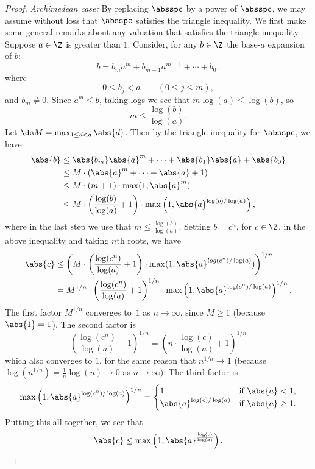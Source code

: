 \documentclass[11pt]{book}
\begin{document}
\begin{ch}
\begin{proof}
{\em Archimedean case:} By replacing $\absspc$ by a power of
$\absspc$, we may assume without loss that $\absspc$ satisfies the
triangle inequality.  We first make some general remarks about any
valuation that satisfies the triangle inequality.
Suppose $a\in\Z$ is greater than $1$.  Consider, for any $b\in\Z$
the base-$a$ expansion of $b$:
$$
  b = b_m a^m + b_{m-1} a^{m-1} + \cdots + b_0,
$$
where
$$
  0 \leq b_j < a \qquad (0\leq j \leq m),
$$
and $b_m\neq 0$.
Since $a^m\leq b$, taking logs we see that
$m\log(a)\leq \log(b)$, so
$$m \leq \frac{\log(b)}{\log(a)}.$$
Let $\ds M=\max_{1\leq d<a}\abs{d}$.  Then by the triangle
inequality for $\absspc$, we have
\begin{align*}
\abs{b}&\leq \abs{b_m}\abs{a}^m + \cdots + \abs{b_1}\abs{a} + \abs{b_0}\\
    & \leq M\cdot (\abs{a}^m + \cdots + \abs{a} + 1)\\
   & \leq M\cdot (m+1)\cdot \max(1,\abs{a}^m)\\
   & \leq M\cdot\left(\frac{\log(b)}{\log(a)} + 1\right)
        \cdot \max\left(1,\abs{a}^{\log(b)/\log(a)}\right),
\end{align*}
where in the last step we use that $m\leq \frac{\log(b)}{\log(a)}$.
Setting $b=c^n$, for $c\in\Z$, in the above inequality and
taking $n$th roots, we have
\begin{align*}
\abs{c} &\leq \left( M\cdot
\left(\frac{\log(c^n)}{\log(a)}+1\right)\cdot
  \max(1,\abs{a}^{log(c^n)/\log(a)})\right)^{1/n}\\
  & = M^{1/n}\cdot\left(
       \frac{\log(c^n)}{\log(a)}+1\right)^{1/n}\cdot
      \max\left(1,\abs{a}^{\log(c^n)/\log(a)}\right)^{1/n}.
\end{align*}
The first factor $M^{1/n}$ converges to~$1$ as $n\to\infty$,
since $M\geq 1$ (because $\abs{1}=1$).  The second factor
is
$$
  \left(\frac{\log(c^n)}{\log(a)}+1\right)^{1/n}
   =
\left(n \cdot \frac{\log(c)}{\log(a)}+1\right)^{1/n}
$$
which also converges to $1$, for the
same reason that $n^{1/n}\to 1$
(because $\log(n^{1/n})=\frac{1}{n}\log(n)\to 0$ as
$n\to\infty$).
The third factor is
$$
\max\left(1,\abs{a}^{\log(c^n)/\log(a)}\right)^{1/n}
  = \begin{cases}
   1 & \text{if }\abs{a}<1,\\
\abs{a}^{\log(c)/\log(a)} & \text{if }\abs{a}\geq 1.
\end{cases}
$$
Putting this all together, we see that
$$
\abs{c} \leq \max\left(1,\abs{a}^{\frac{\log(c)}{\log(a)}}\right).
$$


\end{proof}
\end{ch}
\end{document}
